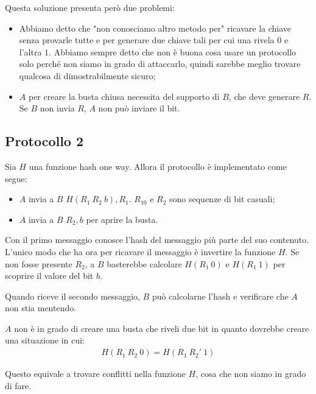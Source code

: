 \noindent Questa soluzione presenta però due problemi:
\begin{itemize}
    \item Abbiamo detto che "non conosciamo altro metodo per" ricavare la chiave senza provarle tutte e per generare due chiave tali per cui una rivela $0$ e l'altra $1$. Abbiamo sempre detto che non è buona cosa usare un protocollo solo perché non siamo in grado di attaccarlo, quindi sarebbe meglio trovare qualcosa di dimostrabilmente sicuro;
    \item $A$ per creare la busta chiusa necessita del supporto di $B$, che deve generare $R$. Se $B$ non invia $R$, $A$ non può inviare il bit.
\end{itemize}

\subsection{Protocollo 2}
Sia $H$ una funzione hash one way. Allora il protocollo è implementato come segue:
\begin{itemize}
    \item $A$ invia a $B$ $H(R_1 \ R_2 \ b), R_1$. $R_10$ e $R_2$ sono sequenze di bit casuali;
    \item $A$ invia a $B$ $R_2, b$ per aprire la busta.
\end{itemize}

\noindent Con il primo messaggio conosce l'hash del messaggio più parte del suo contenuto. L'unico modo che ha ora per ricavare il messaggio è invertire la funzione $H$. Se non fosse presente $R_2$, a $B$ basterebbe calcolare $H(R_1 \ 0)$ e $H(R_1 \ 1)$ per scoprire il valore del bit $b$.

Quando riceve il secondo messaggio, $B$ può calcolarne l'hash e verificare che $A$ non stia mentendo.

$A$ non è in grado di creare una busta che riveli due bit in quanto dovrebbe creare una situazione in cui:
\begin{align*}
    H(R_1 \ R_2 \ 0) = H(R_1 \ R_2' \ 1)
\end{align*}

\noindent Questo equivale a trovare conflitti nella funzione $H$, cosa che non siamo in grado di fare. 
\\

